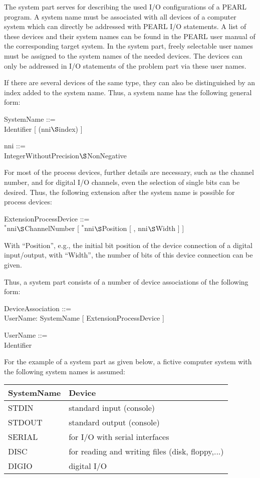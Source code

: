 The system part serves for describing the used I/O configurations of a
PEARL program. A system name must be associated with all devices of a
computer system which can directly be addressed with PEARL I/O
statements. A list of these devices and their system names can be
found in the PEARL user manual of the corresponding target system. In
the system part, freely selectable user names must be assigned to the
system names of the needed devices. The devices can only be addressed in
I/O statements of the problem part via these user names. 
\begin{removed}
If there are
several devices of the same type, they can also be distinguished by an
index added to the system name. Thus, a system name has the following
general form:

SystemName ::=\\
\x Identifier [ (nni$\S $index) ]

nni ::=\\
\x IntegerWithoutPrecision$\S $NonNegative

For most of the process devices, further details are necessary, such as
the channel number, and for digital I/O channels, even the selection of
single bits can be desired. Thus, the following extension after the
system name is possible for process devices:

ExtensionProcessDevice ::=\\
\x $^*$nni$\S $ChannelNumber [ $^*$nni$\S $Position [ , nni$\S $Width ] ]

With ``Position'', e.g., the initial bit position of the device
connection of a digital input/output, with ``Width'', the number of bits
of this device connection can be given.

Thus, a system part consists of a number of device associations of the
following form:

DeviceAssociation ::=\\
\x UserName: SystemName [ ExtensionProcessDevice ]

UserName ::=\\
\x Identifier

For the example of a system part as given below, a fictive computer
system with the following system names is assumed:

\begin{tabular}{l@{\x}l}
SystemName & Device \\ \hline
STDIN      & standard input (console) \\
STDOUT     & standard output (console) \\
SERIAL     & for I/O with serial interfaces \\
DISC       & for reading and writing files (disk, floppy,...)\\
DIGIO      & digital I/O\\
\end{tabular}


\end{removed}

